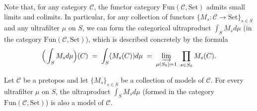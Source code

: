 %


Note that, for any category $\mathcal{C}$, the functor category $\mathrm{Fun}(\mathcal{C},\mathrm{Set})$
admits small limits and colimits. In particular, for any collection of functors
$\{M_s : \mathcal{C} \to \mathrm{Set}\}_{s \in S}$ and any ultrafilter $\mu$ on $S$, we can form
the categorical ultraproduct $\int_S M_s d\mu$ (in the category $\mathrm{Fun}(\mathcal{C},\mathrm{Set})$),
which is described concretely by the formula
\[
\Big(\int_S M_s d\mu\Big)(C) \;=\; \int_S (M_s(C)) d\mu \;=\; \varinjlim_{\mu(S_0)=1}\ \prod_{s \in S_0} M_s(C).
\]


\begin{theorem}
Let $\mathcal{C}$ be a pretopos and let $\{M_s\}_{s \in S}$ be a collection of models
of $\mathcal{C}$. For every ultrafilter $\mu$ on $S$, the ultraproduct $\int_S M_s d\mu$
(formed in the category $\mathrm{Fun}(\mathcal{C},\mathrm{Set})$) is also a
model of $\mathcal{C}$.
\end{theorem}

